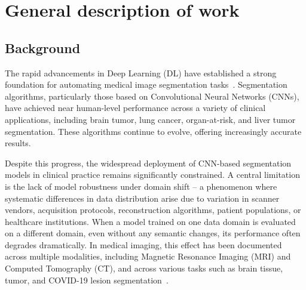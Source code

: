\section*{General description of work} 


\subsection*{Background}


The rapid advancements in Deep Learning (DL) have established a strong foundation for automating medical image segmentation tasks~\cite{lee2017deep}. Segmentation algorithms, particularly those based on Convolutional Neural Networks (CNNs), have achieved near human-level performance across a variety of clinical applications, including brain tumor, lung cancer, organ-at-risk, and liver tumor segmentation. These algorithms continue to evolve, offering increasingly accurate results.


Despite this progress, the widespread deployment of CNN-based segmentation models in clinical practice remains significantly constrained. A central limitation is the lack of model robustness under domain shift -- a phenomenon where systematic differences in data distribution arise due to variation in scanner vendors, acquisition protocols, reconstruction algorithms, patient populations, or healthcare institutions. When a model trained on one data domain is evaluated on a different domain, even without any semantic changes, its performance often degrades dramatically. In medical imaging, this effect has been documented across multiple modalities, including Magnetic Resonance Imaging (MRI) and Computed Tomography (CT), and across various tasks such as brain tissue, tumor, and COVID-19 lesion segmentation~\cite{shirokikh2020first,zakazov2021anatomy,saparov2021zero,shimovolos2022adaptation}.

